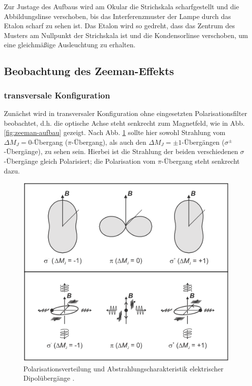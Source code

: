 \documentclass{article}
\begin{document}
\begin{multicols}{2}
Zur Justage des Aufbaus wird am Okular die Strichskala scharfgestellt und
die Abbildungslinse verschoben, bis das Interferenzmuster der Lampe durch das Etalon scharf zu sehen ist.
Das Etalon wird so gedreht, dass das Zentrum des Musters am Nullpunkt der Strichskala ist
und die Kondensorlinse verschoben, um eine gleichmäßige Ausleuchtung zu erhalten.

\subsection{Beobachtung des Zeeman-Effekts}
\subsubsection{transversale Konfiguration}
Zunächst wird in transversaler Konfiguration ohne eingesetzten Polarisationsfilter beobachtet,
d.h. die optische Achse steht senkrecht zum Magnetfeld, wie in Abb. \ref{fig:zeeman-aufbau} gezeigt.
Nach Abb. \ref{fig:zeeman-abstrahlung} sollte hier sowohl Strahlung vom $\Delta M_J=0$-Übergang ($\pi$-Übergang),
als auch den $\Delta M_J=\pm 1$-Übergängen ($\sigma^\pm$-Übergänge), zu sehen sein.
Hierbei ist die Strahlung der beiden verschiedenen $\sigma$-Übergänge gleich Polarisiert;
die Polarisation vom $\pi$-Übergang steht senkrecht dazu.

\begin{figure}[H]
  \centering
  \includegraphics[width=.8\linewidth]{zeeman-abstrahlung}
  \caption{Polarisationsverteilung und Abstrahlungscharakteristik elektrischer Dipolübergänge \cite{Anleitung} \cite{Leybold}.}
  \label{fig:zeeman-abstrahlung}
\end{figure}


\end{multicols}
\end{document}
